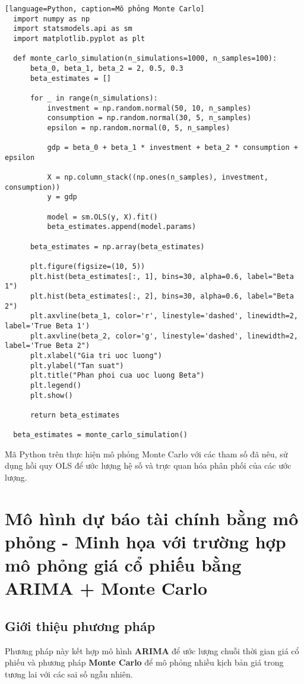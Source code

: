 \begin{lstlisting}[basicstyle=\ttfamily\large][language=Python, caption=Mô phỏng Monte Carlo]
  import numpy as np
  import statsmodels.api as sm
  import matplotlib.pyplot as plt
  
  def monte_carlo_simulation(n_simulations=1000, n_samples=100):
      beta_0, beta_1, beta_2 = 2, 0.5, 0.3  
      beta_estimates = []
      
      for _ in range(n_simulations):
          investment = np.random.normal(50, 10, n_samples)
          consumption = np.random.normal(30, 5, n_samples)
          epsilon = np.random.normal(0, 5, n_samples)
          
          gdp = beta_0 + beta_1 * investment + beta_2 * consumption + epsilon
          
          X = np.column_stack((np.ones(n_samples), investment, consumption))
          y = gdp
          
          model = sm.OLS(y, X).fit()
          beta_estimates.append(model.params)
      
      beta_estimates = np.array(beta_estimates)
      
      plt.figure(figsize=(10, 5))
      plt.hist(beta_estimates[:, 1], bins=30, alpha=0.6, label="Beta 1")
      plt.hist(beta_estimates[:, 2], bins=30, alpha=0.6, label="Beta 2")
      plt.axvline(beta_1, color='r', linestyle='dashed', linewidth=2, label='True Beta 1')
      plt.axvline(beta_2, color='g', linestyle='dashed', linewidth=2, label='True Beta 2")
      plt.xlabel("Gia tri uoc luong")
      plt.ylabel("Tan suat")
      plt.title("Phan phoi cua uoc luong Beta")
      plt.legend()
      plt.show()
      
      return beta_estimates
  
  beta_estimates = monte_carlo_simulation()
  \end{lstlisting}
  

Mã Python trên thực hiện mô phỏng Monte Carlo với các tham số đã nêu, sử dụng hồi quy OLS để ước lượng hệ số và trực quan hóa phân phối của các ước lượng. 



\section{Mô hình dự báo tài chính bằng mô phỏng - Minh họa với trường hợp mô phỏng giá cổ phiếu bằng ARIMA + Monte Carlo}
\subsection{Giới thiệu phương pháp}
Phương pháp này kết hợp mô hình \textbf{ARIMA} để ước lượng chuỗi thời gian giá cổ phiếu và phương pháp \textbf{Monte Carlo} để mô phỏng nhiều kịch bản giá trong tương lai với các sai số ngẫu nhiên.

